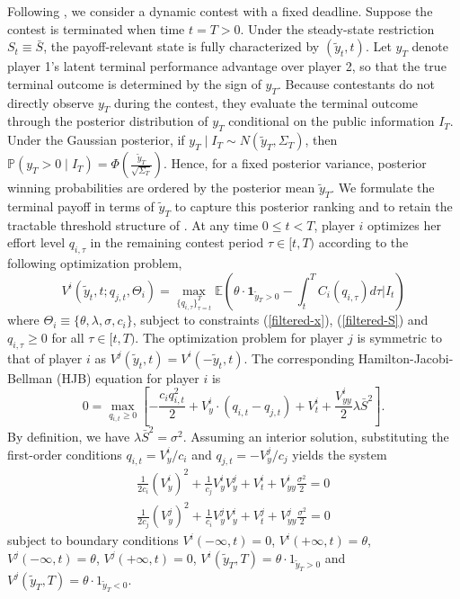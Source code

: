 \documentclass[mnsc]{informs3}
\begin{document}
Following \cite{Ryvkin2022Fight}, we consider a dynamic contest with a fixed deadline.
Suppose the contest is terminated when time $t=T>0$.
Under the steady-state restriction $S_t \equiv \bar S$, the payoff-relevant state is fully characterized by $(\tilde y_t,t)$.
Let $y_T$ denote player 1's latent terminal performance advantage over player 2, so that the true terminal outcome is determined by the sign of $y_T$.
Because contestants do not directly observe $y_T$ during the contest, they evaluate the terminal outcome through the posterior distribution of $y_T$ conditional on the public information $I_T$.
Under the Gaussian posterior, if $y_T\mid I_T\sim N(\tilde y_T,\Sigma_T)$, then $\mathbb P(y_T>0\mid I_T)=\Phi\left(\frac{\tilde y_T}{\sqrt{\Sigma_T}}\right)$. 
Hence, for a fixed posterior variance, posterior winning probabilities are ordered by the posterior mean $\tilde y_T$.
We formulate the terminal payoff in terms of $\tilde y_T$ to capture this posterior ranking and to retain the tractable threshold structure of \citet{Ryvkin2022Fight}.
At any time $0\le t<T$, player $i$ optimizes her effort level $q_{i,\tau}$ in the remaining contest period $\tau\in[t, T)$ according to the following optimization problem,
\begin{equation}\label{v-def}
	V^i(\tilde{y}_{t}, t ; q_{j,t},\Theta_i) = \max_{\{q_{i,\tau}\}^T_{\tau=t}}
\mathbb{E}\left( \theta\cdot\mathbf{1}_{\tilde{y}_T>0} - \int^T_tC_i(q_{i,\tau})d\tau \bigg|I_t\right)
\end{equation}
where $\Theta_i \equiv\{\theta, \lambda, \sigma, c_i\}$, subject to constraints (\ref{filtered-x}), (\ref{filtered-S}) and $q_{i,\tau}\ge0$ for all $\tau\in[t,T)$.
The optimization problem for player $j$ is symmetric to that of player $i$ as $V^j(\tilde{y}_t, t) = V^i(-\tilde{y}_t, t)$.
The corresponding Hamilton-Jacobi-Bellman (HJB) equation for player $i$ is
\begin{equation*}
0 = \max_{q_{i,t}\ge0}\left[-\frac{c_iq_{i,t}^2}{2} + V^i_{y}\cdot\left(q_{i,t}-q_{j,t}\right)+V^i_t + \frac{V^i_{yy}}{2}\lambda \bar{S}^2\right].
\end{equation*}
By definition, we have $\lambda \bar{S}^2 = \sigma^2$.
Assuming an interior solution, substituting the first-order conditions $q_{i,t} = V^i_y/c_i$ and $q_{j,t} = -V^j_y/c_j$ yields the system
\begin{equation*}
\begin{aligned}
\frac{1}{2c_i}(V^i_y)^2 + \frac{1}{c_j}V^i_yV^j_y + V^i_t + V^i_{yy}\frac{\sigma^2}{2} = 0\\
\frac{1}{2c_j}(V^j_y)^2 + \frac{1}{c_i}V^j_yV^i_y + V^j_t + V^j_{yy}\frac{\sigma^2}{2} = 0
\end{aligned}
\end{equation*}
subject to boundary conditions $V^i(-\infty, t) = 0$, $V^i(+\infty, t) = \theta$, $V^j(-\infty, t) = \theta$, $V^j(+\infty, t)=0$, $V^i(\tilde{y}_T, T) = \theta \cdot 1_{\tilde{y}_T > 0}$ and $V^j(\tilde{y}_T, T) = \theta \cdot 1_{\tilde{y}_T < 0}$.
\end{document}
